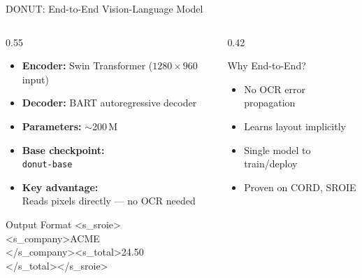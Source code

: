 \documentclass[aspectratio=169,11pt]{beamer}
\begin{document}
\begin{frame}{DONUT: End-to-End Vision-Language Model}
  \begin{columns}[T]
    \begin{column}{0.55\textwidth}
      \begin{itemize}
        \item \textbf{Encoder:} Swin Transformer
              ($1280 \times 960$ input)
        \item \textbf{Decoder:} BART autoregressive decoder
        \item \textbf{Parameters:} $\sim$200\,M
        \item \textbf{Base checkpoint:}\\
              \texttt{\footnotesize donut-base}
        \item \textbf{Key advantage:}\\
              Reads pixels directly --- no OCR needed
      \end{itemize}
      \vspace{0.3cm}
      \begin{exampleblock}{Output Format}
        {\small\ttfamily
        <s\_sroie><s\_company>ACME\\
        </s\_company><s\_total>24.50\\
        </s\_total></s\_sroie>}
      \end{exampleblock}
    \end{column}
    \begin{column}{0.42\textwidth}
      \begin{block}{Why End-to-End?}
        \begin{itemize}
          \item No OCR error propagation
          \item Learns layout implicitly
          \item Single model to train/deploy
          \item Proven on CORD, SROIE
        \end{itemize}
      \end{block}
    \end{column}
  \end{columns}
\end{frame}
\end{document}

